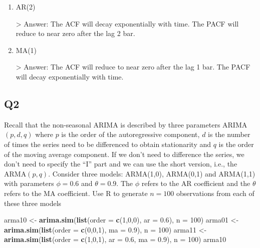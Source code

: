 \documentclass[
]{article}
\newenvironment{Shaded}{\begin{snugshade}}{\end{snugshade}}
\newcommand{\DataTypeTok}[1]{\textcolor[rgb]{0.13,0.29,0.53}{#1}}
\newcommand{\DecValTok}[1]{\textcolor[rgb]{0.00,0.00,0.81}{#1}}
\newcommand{\FloatTok}[1]{\textcolor[rgb]{0.00,0.00,0.81}{#1}}
\newcommand{\KeywordTok}[1]{\textcolor[rgb]{0.13,0.29,0.53}{\textbf{#1}}}
\newcommand{\NormalTok}[1]{#1}
\newcommand{\StringTok}[1]{\textcolor[rgb]{0.31,0.60,0.02}{#1}}
\begin{document}
\begin{enumerate}[label=(\alph*)]

\item AR(2)

> Answer: The ACF will decay exponentially with time. The PACF will reduce to near zero after the lag 2 bar.

\item MA(1)

> Answer: The ACF will reduce to near zero after the lag 1 bar. The PACF will decay exponentially with time. 

\end{enumerate}

\hypertarget{q2}{%
\subsection{Q2}\label{q2}}

Recall that the non-seasonal ARIMA is described by three parameters
ARIMA\((p,d,q)\) where \(p\) is the order of the autoregressive
component, \(d\) is the number of times the series need to be
differenced to obtain stationarity and \(q\) is the order of the moving
average component. If we don't need to difference the series, we don't
need to specify the ``I'' part and we can use the short version, i.e.,
the ARMA\((p,q)\). Consider three models: ARMA(1,0), ARMA(0,1) and
ARMA(1,1) with parameters \(\phi=0.6\) and \(\theta= 0.9\). The \(\phi\)
refers to the AR coefficient and the \(\theta\) refers to the MA
coefficient. Use R to generate \(n=100\) observations from each of these
three models

\begin{Shaded}
\begin{Highlighting}[]
\NormalTok{arma10 <-}\StringTok{ }\KeywordTok{arima.sim}\NormalTok{(}\KeywordTok{list}\NormalTok{(}\DataTypeTok{order =} \KeywordTok{c}\NormalTok{(}\DecValTok{1}\NormalTok{,}\DecValTok{0}\NormalTok{,}\DecValTok{0}\NormalTok{), }\DataTypeTok{ar =} \FloatTok{0.6}\NormalTok{), }\DataTypeTok{n =} \DecValTok{100}\NormalTok{)}
\NormalTok{arma01 <-}\StringTok{ }\KeywordTok{arima.sim}\NormalTok{(}\KeywordTok{list}\NormalTok{(}\DataTypeTok{order =} \KeywordTok{c}\NormalTok{(}\DecValTok{0}\NormalTok{,}\DecValTok{0}\NormalTok{,}\DecValTok{1}\NormalTok{), }\DataTypeTok{ma =} \FloatTok{0.9}\NormalTok{), }\DataTypeTok{n =} \DecValTok{100}\NormalTok{)}
\NormalTok{arma11 <-}\StringTok{ }\KeywordTok{arima.sim}\NormalTok{(}\KeywordTok{list}\NormalTok{(}\DataTypeTok{order =} \KeywordTok{c}\NormalTok{(}\DecValTok{1}\NormalTok{,}\DecValTok{0}\NormalTok{,}\DecValTok{1}\NormalTok{), }\DataTypeTok{ar =} \FloatTok{0.6}\NormalTok{, }\DataTypeTok{ma =} \FloatTok{0.9}\NormalTok{), }\DataTypeTok{n =} \DecValTok{100}\NormalTok{)}
\NormalTok{arma10}
\end{Highlighting}
\end{Shaded}
\end{document}
